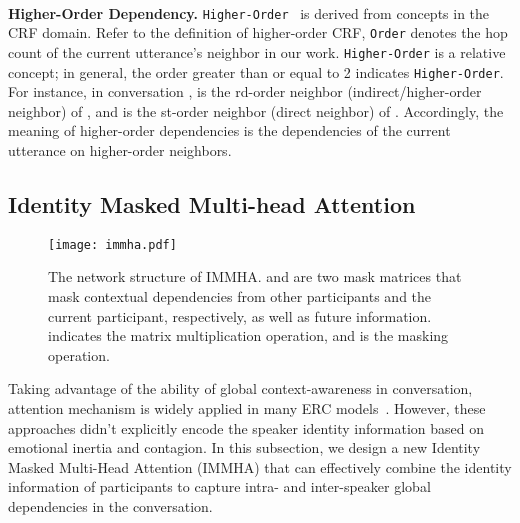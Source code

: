 \documentclass{SCIS2019}
\begin{document}
\\ \noindent
\textbf{Higher-Order Dependency.} \texttt{Higher-Order}~\cite{Li2022AComprehensiveReview,Yu2020Acomprehensivereview} is derived from concepts in the CRF domain. Refer to the definition of higher-order CRF, \texttt{Order} denotes the hop count of the current utterance's neighbor in our work. \texttt{Higher-Order} is a relative concept; in general, the order greater than or equal to 2 indicates \texttt{Higher-Order}. For instance, in conversation ,  is the rd-order neighbor (indirect/higher-order neighbor) of , and  is the st-order neighbor (direct neighbor) of . Accordingly, the meaning of higher-order dependencies is the dependencies of the current utterance on higher-order neighbors.

\subsection{Identity Masked Multi-head Attention}
\begin{figure}[htbp]
	\centering
	\texttt{[image: immha.pdf]}
	\caption{The network structure of IMMHA.  and  are two mask matrices that mask contextual dependencies from other participants and the current participant, respectively, as well as future information.  indicates the matrix multiplication operation, and  is the masking operation.} 
	\label{fig:immha}
\end{figure}
Taking advantage of the ability of global context-awareness in conversation, attention mechanism is widely applied in many ERC models~\cite{zhu2021kat,zhong2019knowledge}. However, these approaches didn't explicitly encode the speaker identity information based on emotional inertia and contagion. In this subsection, we design a new Identity Masked Multi-Head Attention (IMMHA) that can effectively combine the identity information of participants to capture intra- and inter-speaker global dependencies in the conversation.
\end{document}
